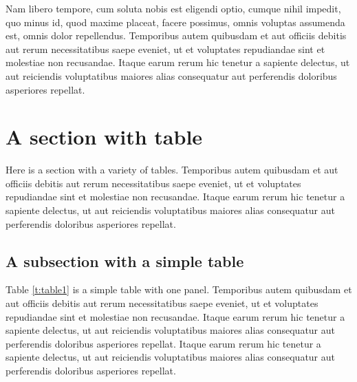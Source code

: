 \documentclass[letterpaper,11pt,leqno]{article}
\begin{document}
Nam libero tempore, cum soluta nobis est eligendi optio, cumque nihil impedit, quo minus id, quod maxime placeat, facere possimus, omnis voluptas assumenda est, omnis dolor repellendus. Temporibus autem quibusdam et aut officiis debitis aut rerum necessitatibus saepe eveniet, ut et voluptates repudiandae sint et molestiae non recusandae. Itaque earum rerum hic tenetur a sapiente delectus, ut aut reiciendis voluptatibus maiores alias consequatur aut perferendis doloribus asperiores repellat. 

\section{A section with table}

Here is a section with a variety of tables. Temporibus autem quibusdam et aut officiis debitis aut rerum necessitatibus saepe eveniet, ut et voluptates repudiandae sint et molestiae non recusandae. Itaque earum rerum hic tenetur a sapiente delectus, ut aut reiciendis voluptatibus maiores alias consequatur aut perferendis doloribus asperiores repellat. 

\subsection{A subsection with a simple table}

Table \ref{t:table1} is a simple table with one panel. Temporibus autem quibusdam et aut officiis debitis aut rerum necessitatibus saepe eveniet, ut et voluptates repudiandae sint et molestiae non recusandae. Itaque earum rerum hic tenetur a sapiente delectus, ut aut reiciendis voluptatibus maiores alias consequatur aut perferendis doloribus asperiores repellat. Itaque earum rerum hic tenetur a sapiente delectus, ut aut reiciendis voluptatibus maiores alias consequatur aut perferendis doloribus asperiores repellat. 
\end{document}
